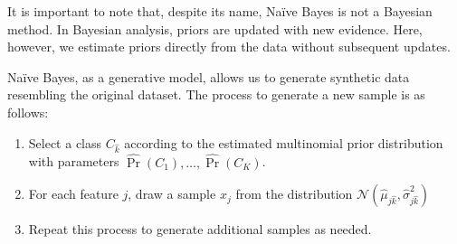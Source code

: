 It is important to note that, despite its name, Naïve Bayes is not a Bayesian method. 
In Bayesian analysis, priors are updated with new evidence. 
Here, however, we estimate priors directly from the data without subsequent updates.

Naïve Bayes, as a generative model, allows us to generate synthetic data resembling the original dataset. 
The process to generate a new sample is as follows:
\begin{enumerate}
    \item Select a class $C_{\hat{k}}$ according to the estimated multinomial prior distribution with parameters $\hat{\Pr}(C_1),\dots,\hat{\Pr}(C_K)$.
    \item For each feature $j$, draw a sample $x_j$ from the distribution $\mathcal{N}(\hat{\mu}_{j\hat{k}},\hat{\sigma}^2_{j\hat{k}})$
    \item Repeat this process to generate additional samples as needed.
\end{enumerate}

